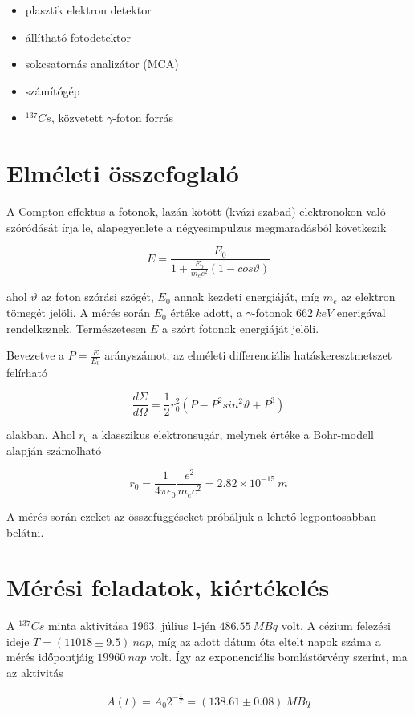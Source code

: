 \documentclass[a4paper,12pt]{article}
\begin{document}
\begin{itemize}
\item plasztik elektron detektor
\item állítható fotodetektor
\item sokcsatornás analizátor (MCA)
\item számítógép
\item $^{137}Cs$, közvetett $\gamma$-foton forrás
\end{itemize}

\vspace{2cm}

\section{Elméleti összefoglaló}

\par A Compton-effektus a fotonok, lazán kötött (kvázi szabad) elektronokon való szóródását írja le, alapegyenlete a négyesimpulzus megmaradásból következik

\begin{equation*}
	E = \frac{E_{0}}{1 + \frac{E_{0}}{m_{e}c^{2}}(1 - cos\vartheta)}	
\end{equation*}

ahol $\vartheta$ az foton szórási szögét, $E_{0}$ annak kezdeti energiáját, míg $m_{e}$ az elektron tömegét jelöli. A mérés során $E_{0}$ értéke adott, a $\gamma$-fotonok $662~keV$ enerigával rendelkeznek. Természetesen $E$ a szórt fotonok energiáját jelöli.
\par Bevezetve a $P = \frac{E}{E_{0}}$ arányszámot, az elméleti differenciális hatáskeresztmetszet felírható

\begin{equation*}
	\frac{d\Sigma}{d\Omega} = \frac{1}{2}r_{0}^{2}(P - P^{2}sin^{2}\vartheta + P^{3})
\end{equation*}

alakban. Ahol $r_{0}$ a klasszikus elektronsugár, melynek értéke a Bohr-modell alapján számolható

\begin{equation*}
	r_{0} = \frac{1}{4\pi\epsilon_{0}}\frac{e^{2}}{m_{e}c^{2}} = 2.82 \times 10^{-15} ~m
\end{equation*}

\par A mérés során ezeket az összefüggéseket próbáljuk a lehető legpontosabban belátni.

\section{Mérési feladatok, kiértékelés}

\par A $^{137}Cs$ minta aktivitása 1963. július 1-jén $486.55~MBq$ volt. A cézium felezési ideje $T = (11018 \pm 9.5)~nap$, míg az adott dátum óta eltelt napok száma a mérés időpontjáig $19 960~nap$ volt. Így az exponenciális bomlástörvény szerint, ma az aktivitás

\begin{equation*}
	A(t) = A_{0}2^{-\frac{t}{T}} = (138.61 \pm 0.08)~MBq
\end{equation*}
\end{document}
